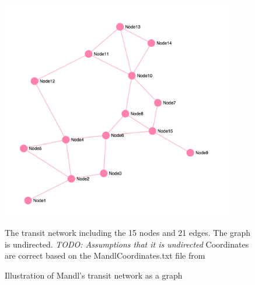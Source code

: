 \begin{figure}[H]
\begin{center}
  \includegraphics[width=4in]{assets/mandlnetwork_crop.png}
  \end{center}
  \caption{Illustration of Mandl's transit network as a graph}
  \label{fig:MandlNetwork} 
   The transit network including the 15 nodes and 21 edges. The graph is undirected. \emph{\color{blue} TODO: Assumptions that it is undirected} Coordinates are correct based on the MandlCoordinates.txt file from \citep{mumford13}
\end{figure}